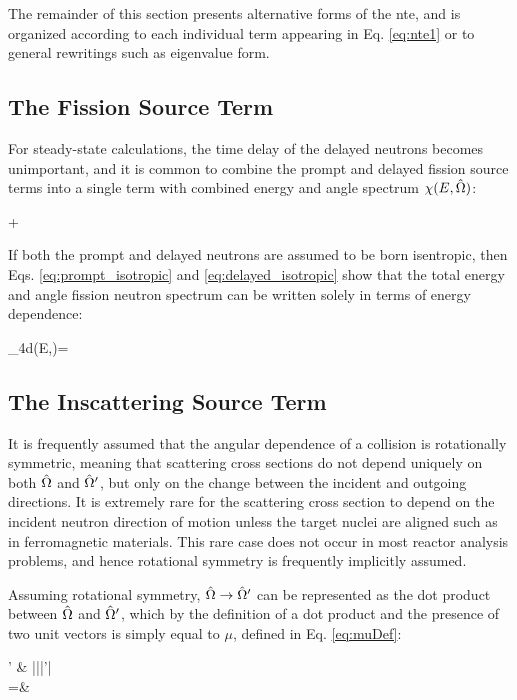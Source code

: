 The remainder of this section presents alternative forms of the \gls{nte}, and is organized according to each individual term appearing in Eq. \eqref{eq:nte1} or to general rewritings such as eigenvalue form.

\subsection{The Fission Source Term}

For steady-state calculations, the time delay of the delayed neutrons becomes unimportant, and it is common to combine the prompt and delayed fission source terms into a single term with combined energy and angle spectrum \(\chi(E,\hat{\Omega})\):

\beqa
\promptfissionsource\psi\seatprime+\delayedfissionsource\rightarrow\\
\totalfissionsource\psi\seatprime
\eeqa

If both the prompt and delayed neutrons are assumed to be born isentropic, then Eqs. \eqref{eq:prompt_isotropic} and \eqref{eq:delayed_isotropic} show that the total energy and angle fission neutron spectrum can be written solely in terms of energy dependence:

\beq
\int_{4\pi}d\hO\chi(E,\hO)=
\eeq

\subsection{The Inscattering Source Term}

It is frequently assumed that the angular dependence of a collision is rotationally symmetric, meaning that scattering cross sections do not depend uniquely on both \(\hat{\Omega}\) and \(\hat{\Omega}'\), but only on the change between the incident and outgoing directions. It is extremely rare for the scattering cross section to depend on the incident neutron direction of motion unless the target nuclei are aligned such as in ferromagnetic materials. This rare case does not occur in most reactor analysis problems, and hence rotational symmetry is frequently implicitly assumed.

Assuming rotational symmetry, \(\hat{\Omega}\rightarrow\hat{\Omega}'\) can be represented as the dot product between \(\hat{\Omega}\) and \(\hat{\Omega}'\), which by the definition of a dot product and the presence of two unit vectors is simply equal to \(\mu\), defined in Eq. \eqref{eq:muDef}:

\beqa
\label{eq:OmegaDotOmega}
\hO  \cdot\hO  ' \equiv& |\hO  ||\hO  '| \cos{(\theta)} \\
=&\ \mu
\eeqa

